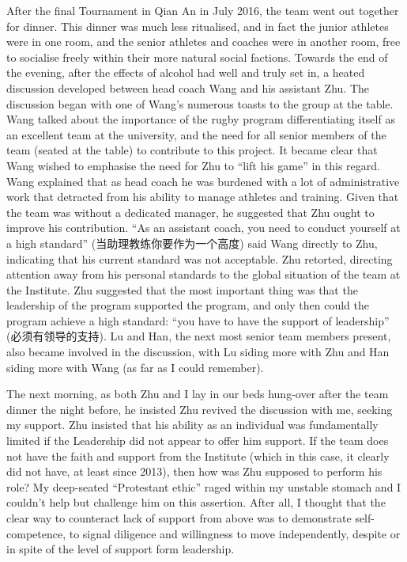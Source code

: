 \begin{CJK}{UTF8}{gbsn}
  After the final Tournament in Qian An in July 2016, the team went out together for dinner.  This dinner was much less ritualised, and in fact the junior athletes were in one room, and the senior athletes and coaches were in another room, free to socialise freely within their more natural social factions.  Towards the end of the evening, after the effects of alcohol had well and truly set in, a heated discussion developed between head coach Wang and his assistant Zhu. The discussion began with one of Wang's numerous toasts to the group at the table. Wang talked about the importance of the rugby program differentiating itself as an excellent team at the university, and the need for all senior members of the team (seated at the table) to contribute to this project.  It became clear that Wang wished to emphasise the need for Zhu to ``lift his game'' in this regard. Wang explained that as head coach he was burdened with a lot of administrative work that detracted from his ability to manage athletes and training.  Given that the team was without a dedicated manager, he suggested that Zhu ought to improve his contribution. ``As an assistant coach, you need to conduct yourself at a high standard'' (当助理教练你要作为一个高度) said Wang directly to Zhu, indicating that his current standard was not acceptable.  Zhu retorted, directing attention away from his personal standards to the global situation of the team at the Institute.  Zhu suggested that the most important thing was that the leadership of the program supported the program, and only then could the program achieve a high standard: ``you have to have the support of leadership'' (必须有领导的支持).  Lu and Han, the next most senior team members present, also became involved in the discussion, with Lu siding more with Zhu and Han siding more with Wang (as far as I could remember).

  The next morning, as both Zhu and I lay in our beds hung-over after the team dinner the night before, he insisted Zhu revived the discussion with me, seeking my support.   Zhu insisted that his ability as an individual was fundamentally limited if the Leadership did not appear to offer him support.  If the team does not have the faith and support from the Institute (which in this case, it clearly did not have, at least since 2013), then how was Zhu supposed to perform his role? My deep-seated ``Protestant ethic'' raged within my unstable stomach and I couldn't help but challenge him on this assertion.  After all, I thought that the clear way to counteract lack of support from above was to demonstrate self-competence, to signal diligence and willingness to move independently, despite or in spite of the level of support form leadership.


\end{CJK}
